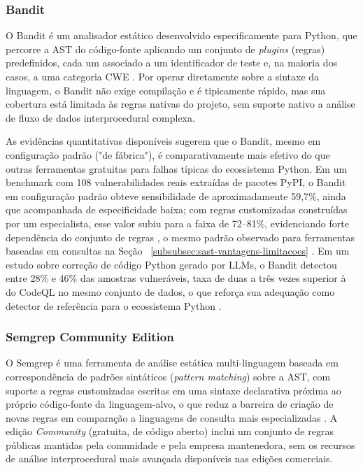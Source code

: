 \subsubsection{Bandit}\label{subsubsec:bandit}
O Bandit é um analisador estático desenvolvido especificamente para Python, que percorre a AST do código-fonte aplicando um conjunto de \textit{plugins} (regras) predefinidos, cada um associado a um identificador de teste e, na maioria dos casos, a uma categoria CWE \cite{Dalaq2025SASTSLR}. Por operar diretamente sobre a sintaxe da linguagem, o Bandit não exige compilação e é tipicamente rápido, mas sua cobertura está limitada às regras nativas do projeto, sem suporte nativo a análise de fluxo de dados interprocedural complexa.

As evidências quantitativas disponíveis sugerem que o Bandit, mesmo em configuração padrão ("de fábrica"), é comparativamente mais efetivo do que outras ferramentas gratuitas para falhas típicas do ecossistema Python. Em um benchmark com 108 vulnerabilidades reais extraídas de pacotes PyPI, o Bandit em configuração padrão obteve sensibilidade de aproximadamente 59,7\%, ainda que acompanhada de especificidade baixa; com regras customizadas construídas por um especialista, esse valor subiu para a faixa de 72–81\%, evidenciando forte dependência do conjunto de regras , o mesmo padrão observado para ferramentas baseadas em consultas na Seção ~\ref{subsubsec:sast-vantagens-limitacoes} \cite{Marquer2026SAGA}. Em um estudo sobre correção de código Python gerado por LLMs, o Bandit detectou entre 28\% e 46\% das amostras vulneráveis, taxa de duas a três vezes superior à do CodeQL no mesmo conjunto de dados, o que reforça sua adequação como detector de referência para o ecossistema Python \cite{Alrashedy2025FDSP}.

\subsubsection{Semgrep Community Edition}\label{subsubsec:semgrep-ce}
O Semgrep é uma ferramenta de análise estática multi-linguagem baseada em correspondência de padrões sintáticos (\textit{pattern matching}) sobre a AST, com suporte a regras customizadas escritas em uma sintaxe declarativa próxima ao próprio código-fonte da linguagem-alvo, o que reduz a barreira de criação de novas regras em comparação a linguagens de consulta mais especializadas \cite{Dalaq2025SASTSLR}. A edição \textit{Community} (gratuita, de código aberto) inclui um conjunto de regras públicas mantidas pela comunidade e pela empresa mantenedora, sem os recursos de análise interprocedural mais avançada disponíveis nas edições comerciais.

